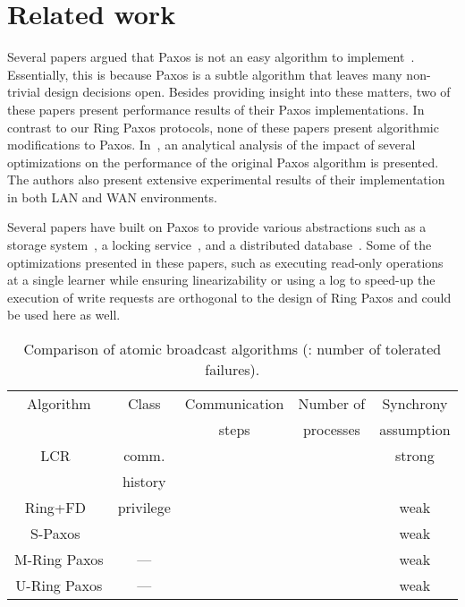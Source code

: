 \documentclass[final,3p,times,twocolumn,authoryear]{elsarticle}
\begin{document}
\section{Related work}
\label{sec:rwork}


Several papers argued that Paxos is not an easy algorithm to implement~\cite{CGR07,KA08,RVR11}. Essentially, this is because Paxos is a subtle algorithm that leaves many non-trivial design decisions open. Besides providing insight into these matters, two of these papers present performance results of their Paxos implementations. In contrast to our Ring Paxos protocols, none of these papers present algorithmic modifications to Paxos. In~\cite{SS12}, an analytical analysis of the impact of several optimizations on the performance of the original Paxos algorithm is presented.  The authors also present extensive experimental results of their implementation in both LAN and WAN environments.

Several papers have built on Paxos to provide various abstractions such as a storage system~\cite{B2011}, a locking service~\cite{Bur06}, and a distributed database~\cite{megastore}.  Some of the optimizations presented in these papers, such as executing read-only operations at a single learner while ensuring linearizability or using a log to speed-up the execution of write requests are orthogonal to the design of Ring Paxos and could be used here as well.


\begin{table*}
\center
\caption{Comparison of atomic broadcast algorithms (: number of tolerated failures).}
\vspace{4mm}
\label{table:algo_comparison}

\begin{tabular}{|c|c|c|c|c|} \hline

Algorithm				& Class	& Communication	& Number of  	& Synchrony	\\
					&		& steps			& processes	& assumption	\\ \hline \hline
LCR~\cite{Guerraoui2010}& comm.	& 			& 		& strong		\\
                              		& history	&         			&			&			\\ \hline
Ring+FD~\cite{ESU04}  & privilege &   &  &
weak \\ \hline
S-Paxos~\cite{spaxos}  & &   &  & weak \\ \hline

M-Ring Paxos & --- &  &  & weak\\ \hline
U-Ring Paxos & --- &  &  & weak\\ \hline
\end{tabular}


\end{table*}
\end{document}
